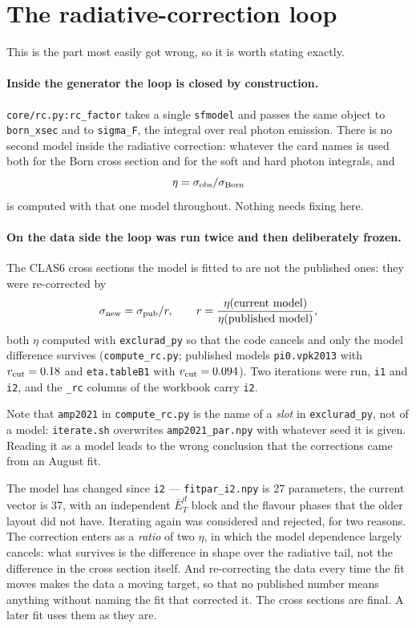 \documentclass[11pt,a4paper]{article}
\newcommand{\code}[1]{\texttt{#1}}
\begin{document}
\section{The radiative-correction loop}

This is the part most easily got wrong, so it is worth stating exactly.

\paragraph{Inside the generator the loop is closed by construction.}
\code{core/rc.py:rc\_factor} takes a single \code{sfmodel} and passes the same
object to \code{born\_xsec} and to \code{sigma\_F}, the integral over real photon
emission.  There is no second model inside the radiative correction: whatever
the card names is used both for the Born cross section and for the soft and hard
photon integrals, and
\[
\eta = \sigma_{\rm obs}/\sigma_{\rm Born}
\]
is computed with that one model throughout.  Nothing needs fixing here.

\paragraph{On the data side the loop was run twice and then deliberately
frozen.}  The CLAS6 cross sections the model is fitted to are not the published
ones: they were re-corrected by
\[
\sigma_{\rm new} = \sigma_{\rm pub} / r, \qquad
r = \frac{\eta(\text{current model})}{\eta(\text{published model})},
\]
both $\eta$ computed with \code{exclurad\_py} so that the code cancels and only
the model difference survives (\code{compute\_rc.py}; published models
\code{pi0.vpk2013} with $v_{\rm cut} = 0.18$ and \code{eta.tableB1} with
$v_{\rm cut} = 0.094$).  Two iterations were run, \code{i1} and \code{i2}, and
the \code{\_rc} columns of the workbook carry \code{i2}.

Note that \code{amp2021} in \code{compute\_rc.py} is the name of a \emph{slot}
in \code{exclurad\_py}, not of a model: \code{iterate.sh} overwrites
\code{amp2021\_par.npy} with whatever seed it is given.  Reading it as a model
leads to the wrong conclusion that the corrections came from an August fit.

The model has changed since \code{i2} --- \code{fitpar\_i2.npy} is 27
parameters, the current vector is 37, with an independent $\bar E_T^d$ block
and the flavour phases that the older layout did not have.  Iterating again was
considered and rejected, for two reasons.  The correction enters as a
\emph{ratio} of two $\eta$, in which the model dependence largely cancels: what
survives is the difference in shape over the radiative tail, not the difference
in the cross section itself.  And re-correcting the data every time the fit
moves makes the data a moving target, so that no published number means
anything without naming the fit that corrected it.  The cross sections are
final.  A later fit uses them as they are.
\end{document}
